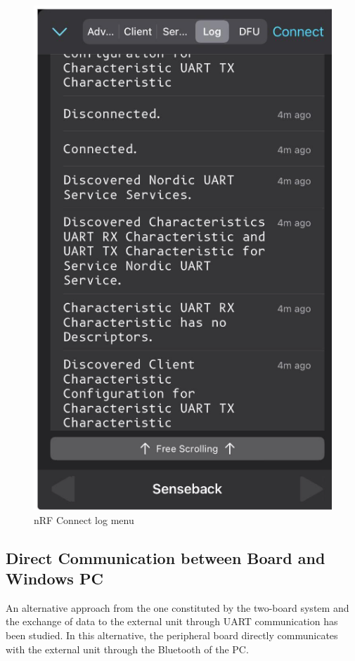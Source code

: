\documentclass{Configuration_Files/PoliMi3i_thesis}
\begin{document}
\begin{figure}[H]
    \centering
    \includegraphics[scale=0.6]{Multicentral/15.png}
    \caption{nRF Connect log menu}
    \label{multicentral_15}
\end{figure}

\subsection{Direct Communication between Board and Windows PC}

An alternative approach from the one constituted by the two-board system and the exchange of data to the external unit through UART communication has been studied. In this alternative, the peripheral board directly communicates with the external unit through the Bluetooth of the PC.
\end{document}
